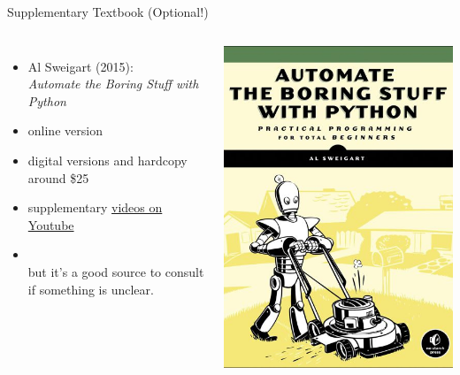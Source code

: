 \documentclass[professionalfonts, xcolor={usenames,svgnames,x11names,table}]{beamer}
\begin{document}
\begin{frame}{Supplementary Textbook (Optional!)}
    \begin{columns}
            \begin{itemize}
                \item Al Sweigart (2015):\\
                      \emph{Automate the Boring Stuff with Python}
                \item online version 
                \item digital versions and hardcopy around \$25
                \item supplementary \href{https://www.youtube.com/playlist?list=PLGoJzB271_7r-iLYuEHEPJ5pSIYxXjJEn}{videos on Youtube}
                \item {}\\
                      but it's a good source to consult if something is unclear.
            \end{itemize}

            \includegraphics[width=.9\linewidth]{./img/textbook}
    \end{columns}
\end{frame}
\end{document}
